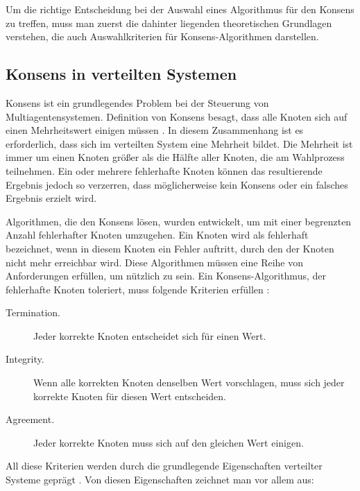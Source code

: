 Um die richtige Entscheidung bei der Auswahl eines Algorithmus für den Konsens zu treffen, muss man zuerst die dahinter liegenden theoretischen Grundlagen verstehen, die auch Auswahlkriterien für Konsens-Algorithmen darstellen.

\subsection{Konsens in verteilten Systemen}

Konsens ist ein grundlegendes Problem bei der Steuerung von Multiagentensystemen. Definition von Konsens besagt, dass alle Knoten sich auf einen Mehrheitswert einigen müssen \cite{Saber03consensusproblems}. In diesem Zusammenhang ist es erforderlich, dass sich im verteilten System eine Mehrheit bildet. Die Mehrheit ist immer um einen Knoten größer als die Hälfte aller Knoten, die am Wahlprozess teilnehmen. Ein oder mehrere fehlerhafte Knoten können das resultierende Ergebnis jedoch so verzerren, dass möglicherweise kein Konsens oder ein falsches Ergebnis erzielt wird.

Algorithmen, die den Konsens lösen, wurden entwickelt, um mit einer begrenzten Anzahl fehlerhafter Knoten umzugehen. Ein Knoten wird als fehlerhaft bezeichnet, wenn in diesem Knoten ein Fehler auftritt, durch den der Knoten nicht mehr erreichbar wird. Diese Algorithmen müssen eine Reihe von Anforderungen erfüllen, um nützlich zu sein. Ein Konsens-Algorithmus, der fehlerhafte Knoten toleriert, muss folgende Kriterien erfüllen \cite{Fischer83impossibilityof}:

\begin{description} 
	\item[Termination.] Jeder korrekte Knoten entscheidet sich für einen Wert.
	
	\item[Integrity.] Wenn alle korrekten Knoten denselben Wert vorschlagen, muss sich jeder korrekte Knoten für diesen Wert entscheiden.
	
	\item[Agreement.] Jeder korrekte Knoten muss sich auf den gleichen Wert einigen.
\end{description}

All diese Kriterien werden durch die grundlegende Eigenschaften verteilter Systeme geprägt \cite{Chandra96unreliablefailure}. Von diesen Eigenschaften zeichnet man vor allem aus:


